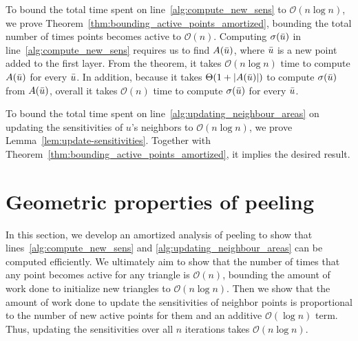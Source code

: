\documentclass{cccg24}
\newcommand{\Oh}[1]{\mathcal{O}\!\lrParents{#1}}
\newcommand{\OhTheta}[1]{\Theta\!\lrParents{#1}}
\newcommand{\lrParents}[1]{\left( #1 \right)}
\newcommand{\lrSize}[1]{\left| #1 \right|}
\newcommand{\logn}{\log{n}}
\newcommand{\sens}[1]{\sigma\!\lrParents{#1}}
\begin{document}
To bound the total time spent on line~\ref{alg:compute_new_sens} to $\Oh{n\log n}$, we prove Theorem~\ref{thm:bounding_active_points_amortized}, bounding the total number of times points becomes active to $\Oh{n}$. 
Computing $\sens{\Bar u}$ in line~\ref{alg:compute_new_sens} requires us to find $A(\Bar u)$, where $\Bar u$ is a new point added to the first layer. 
From the theorem, it takes $\Oh{n\logn}$ time to compute $A(\Bar u)$ for every $\Bar u$. In addition, because it takes $\OhTheta{1 + |A(\Bar u)|}$ to compute $\sens{\Bar u}$ from $A(\Bar u)$, overall it takes $\Oh{n}$ time to compute $\sens{\Bar u}$ for every $\Bar u$.


To bound the total time spent on line~\ref{alg:updating_neighbour_areas} on updating the sensitivities of $u$'s neighbors to $\Oh{n \log n}$, we prove Lemma~\ref{lem:update-sensitivities}. Together with Theorem~\ref{thm:bounding_active_points_amortized}, it implies the desired result.


\section{Geometric properties of peeling}
In this section, we develop an amortized analysis of peeling to show that lines~\ref{alg:compute_new_sens} and \ref{alg:updating_neighbour_areas} can be computed efficiently. We ultimately aim to show that the number of times that any point becomes active for any triangle is $\Oh{n}$, bounding the amount of work done to initialize new triangles to $\Oh{n\log n}$. 
Then we show that the amount of work done to update the sensitivities of neighbor points is proportional to the number of new active points for them and an additive $\Oh{\log n}$ term. 
Thus, updating the sensitivities over all $n$ iterations takes $\Oh{n\log n}$.
\end{document}
